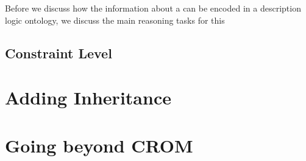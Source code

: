 Before we discuss how the information about a \SCROM can be encoded in a description logic ontology,
we discuss the main reasoning tasks for this


\subsection{Constraint Level}
\label{sec:constraint-level}


\section{Adding Inheritance}
\label{sec:adding-inheritance}



\section{Going beyond CROM}
\label{sec:going-beyond-crom}









